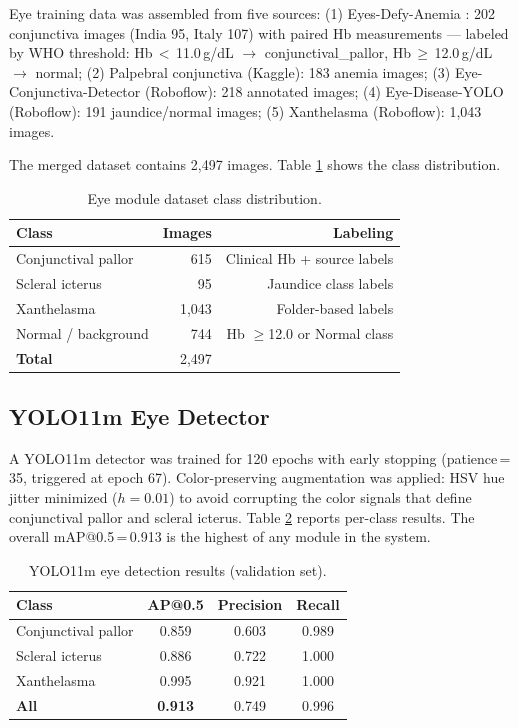 \documentclass[journal]{IEEEtran}
\begin{document}
Eye training data was assembled from five sources:
(1) Eyes-Defy-Anemia \cite{eyesdefyanemia}: 202 conjunctiva images
(India 95, Italy 107) with paired Hb measurements — labeled by WHO
threshold: Hb\,$<$\,11.0\,g/dL $\to$ conjunctival\_pallor,
Hb\,$\geq$\,12.0\,g/dL $\to$ normal;
(2) Palpebral conjunctiva (Kaggle): 183 anemia images;
(3) Eye-Conjunctiva-Detector (Roboflow): 218 annotated images;
(4) Eye-Disease-YOLO (Roboflow): 191 jaundice/normal images;
(5) Xanthelasma (Roboflow): 1{,}043 images.

The merged dataset contains 2{,}497 images.
Table \ref{tab:eye_dataset} shows the class distribution.

\begin{table}[h]
\centering
\caption{Eye module dataset class distribution.}
\label{tab:eye_dataset}
\begin{tabular}{lrr}
\toprule
\textbf{Class} & \textbf{Images} & \textbf{Labeling} \\
\midrule
Conjunctival pallor  & 615  & Clinical Hb + source labels \\
Scleral icterus      &  95  & Jaundice class labels \\
Xanthelasma          & 1{,}043 & Folder-based labels \\
Normal / background  & 744  & Hb $\geq$12.0 or Normal class \\
\midrule
\textbf{Total}       & 2{,}497 & \\
\bottomrule
\end{tabular}
\end{table}

\subsection{YOLO11m Eye Detector}

A YOLO11m \cite{ultralytics2024} detector was trained for 120 epochs
with early stopping (patience\,=\,35, triggered at epoch 67).
Color-preserving augmentation was applied: HSV hue jitter minimized
($h=0.01$) to avoid corrupting the color signals that define
conjunctival pallor and scleral icterus. Table \ref{tab:eye_detection}
reports per-class results. The overall mAP@0.5\,=\,0.913 is the
highest of any module in the system.

\begin{table}[h]
\centering
\caption{YOLO11m eye detection results (validation set).}
\label{tab:eye_detection}
\begin{tabular}{lccc}
\toprule
\textbf{Class} & \textbf{AP@0.5} & \textbf{Precision} & \textbf{Recall} \\
\midrule
Conjunctival pallor & 0.859 & 0.603 & 0.989 \\
Scleral icterus     & 0.886 & 0.722 & 1.000 \\
Xanthelasma         & 0.995 & 0.921 & 1.000 \\
\midrule
\textbf{All}        & \textbf{0.913} & 0.749 & 0.996 \\
\bottomrule
\end{tabular}
\end{table}
\end{document}

